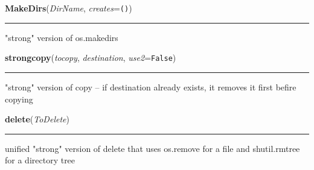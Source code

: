     \label{System:Utils:MakeDirs}

    \vspace{0.5ex}

\hspace{.8\funcindent}\begin{boxedminipage}{\funcwidth}

    \raggedright \textbf{MakeDirs}(\textit{DirName}, \textit{creates}={\tt ()})

    \vspace{-1.5ex}

    \rule{\textwidth}{0.5\fboxrule}
\setlength{\parskip}{2ex}
    "strong" version of os.makedirs

\setlength{\parskip}{1ex}
    \end{boxedminipage}

    \label{System:Utils:strongcopy}

    \vspace{0.5ex}

\hspace{.8\funcindent}\begin{boxedminipage}{\funcwidth}

    \raggedright \textbf{strongcopy}(\textit{tocopy}, \textit{destination}, \textit{use2}={\tt False})

    \vspace{-1.5ex}

    \rule{\textwidth}{0.5\fboxrule}
\setlength{\parskip}{2ex}
    "strong" version of copy -- if destination already exists, it removes 
    it first befire copying

\setlength{\parskip}{1ex}
    \end{boxedminipage}

    \label{System:Utils:delete}

    \vspace{0.5ex}

\hspace{.8\funcindent}\begin{boxedminipage}{\funcwidth}

    \raggedright \textbf{delete}(\textit{ToDelete})

    \vspace{-1.5ex}

    \rule{\textwidth}{0.5\fboxrule}
\setlength{\parskip}{2ex}
    unified "strong" version of delete that uses os.remove for a file and 
    shutil.rmtree for a directory tree

\setlength{\parskip}{1ex}
    \end{boxedminipage}

